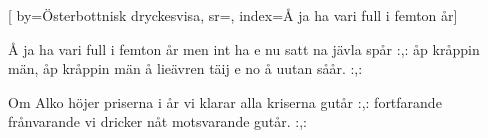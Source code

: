 

[ 		%
	by={Österbottnisk dryckesvisa},					%
	sr={},					%
	index={Å ja ha vari full i femton år}]						%
	


\beginverse*						%
Å ja ha vari full i femton år
men int ha e nu satt na jävla spår
:,: åp kråppin män, åp kråppin män
å lieävren täij e no å uutan såår. :,:
\endverse							%

\beginverse*						%
Om Alko höjer priserna i år
vi klarar alla kriserna gutår
:,: fortfarande frånvarande
vi dricker nåt motsvarande gutår. :,:
\endverse

\endsong							%
